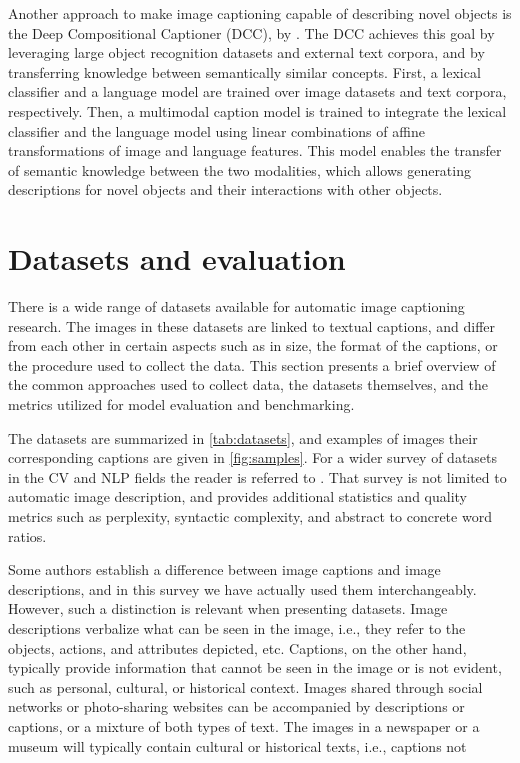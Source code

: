 Another approach to make image captioning capable of describing novel objects is the Deep Compositional Captioner (DCC), by \citet{Hendricks2016}. The DCC achieves this goal by leveraging large object recognition datasets and external text corpora, and by transferring knowledge between semantically similar concepts. First, a lexical classifier and a language model are trained over image datasets and text corpora, respectively. Then, a multimodal caption model is trained to integrate the lexical classifier and the language model using linear combinations of affine transformations of image and language features. This model enables the transfer of semantic knowledge between the two modalities, which allows generating descriptions for novel objects and their interactions with other objects. 


\section{Datasets and evaluation}

There is a wide range of datasets available for automatic image captioning research. The images in these datasets are linked to textual captions, and differ from each other in certain aspects such as in size, the format of the captions, or the procedure used to collect the data. This section presents a brief overview of the common approaches used to collect data, the datasets themselves, and the metrics utilized for model evaluation and benchmarking.

The datasets are summarized in \cref{tab:datasets}, and examples of images their corresponding captions are given in \cref{fig:samples}. For a wider survey of datasets in the CV and NLP fields the reader is referred to \citet{Ferraro2015}. That survey is not limited to automatic image description, and provides additional statistics and quality metrics such as perplexity, syntactic complexity, and abstract to concrete word ratios.

Some authors establish a difference between image captions and image descriptions, and in this survey we have actually used them interchangeably. However, such a distinction is relevant when presenting datasets. Image descriptions verbalize what can be seen in the image, i.e., they refer to the objects, actions, and attributes depicted, etc. Captions, on the other hand, typically provide information that cannot be seen in the image or is not evident, such as personal, cultural, or historical context. Images shared through social networks or photo-sharing websites can be accompanied by descriptions or captions, or a mixture of both types of text. The images in a newspaper or a museum will typically contain cultural or historical texts, i.e., captions not 

